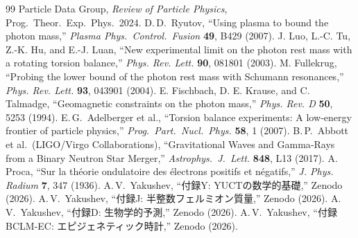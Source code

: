 \documentclass[11pt,a4paper]{article}
\begin{document}
	\begin{thebibliography}{99}
		 Particle Data Group, \emph{Review of Particle Physics}, Prog.\ Theor.\ Exp.\ Phys.\ 2024.
		 D.\,D.\ Ryutov, ``Using plasma to bound the photon mass,'' \emph{Plasma Phys.\ Control.\ Fusion} \textbf{49}, B429 (2007).
		 J. Luo, L.-C. Tu, Z.-K. Hu, and E.-J. Luan, ``New experimental limit on the photon rest mass with a rotating torsion balance,'' \emph{Phys. Rev. Lett.} \textbf{90}, 081801 (2003).
		 M. Fullekrug, ``Probing the lower bound of the photon rest mass with Schumann resonances,'' \emph{Phys. Rev. Lett.} \textbf{93}, 043901 (2004).
		 E. Fischbach, D. E. Krause, and C. Talmadge, ``Geomagnetic constraints on the photon mass,'' \emph{Phys. Rev. D} \textbf{50}, 5253 (1994).
		 E.\,G.\ Adelberger et al., ``Torsion balance experiments: A low‑energy frontier of particle physics,'' \emph{Prog.\ Part.\ Nucl.\ Phys.} \textbf{58}, 1 (2007).
		 B.\,P.\ Abbott et al.\ (LIGO/Virgo Collaborations), ``Gravitational Waves and Gamma‑Rays from a Binary Neutron Star Merger,'' \emph{Astrophys.\ J.\ Lett.} \textbf{848}, L13 (2017).
		 A. Proca, ``Sur la théorie ondulatoire des électrons positifs et négatifs,'' \emph{J. Phys. Radium} \textbf{7}, 347 (1936).
		 A.\,V.\ Yakushev, ``付録Y: YUCTの数学的基礎,'' Zenodo (2026).
		 A.\,V.\ Yakushev, ``付録J: 半整数フェルミオン質量,'' Zenodo (2026).
		 A.\,V.\ Yakushev, ``付録D: 生物学的予測,'' Zenodo (2026).
		 A.\,V.\ Yakushev, ``付録BCLM‑EC: エピジェネティック時計,'' Zenodo (2026).
	\end{thebibliography}
	
\end{document}
